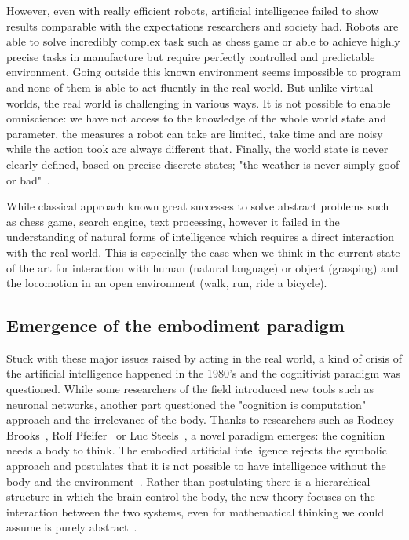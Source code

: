 However, even with really efficient robots, artificial intelligence failed to show results comparable with the expectations researchers and society had. Robots are able to solve incredibly complex task such as chess game or able to achieve highly precise tasks in manufacture but require perfectly controlled and predictable environment. Going outside this known environment seems impossible to program and none of them is able to act fluently in the real world.
But unlike virtual worlds, the real world is challenging in various ways. It is not possible to enable omniscience: we have not access to the knowledge of the whole world state and parameter, the measures a robot can take are limited, take time and are noisy while the action took are always different that. Finally, the world state is never clearly defined, based on precise discrete states; "the weather is never simply goof or bad"~\cite{piefer06}.

While classical approach known great successes to solve abstract problems such as chess game, search engine, text processing, however it failed in the understanding of natural forms of intelligence which requires a direct interaction with the real world. This is especially the case when we think in the current state of the art for interaction with human (natural language) or object (grasping) and the locomotion in an open environment (walk, run, ride a bicycle).

\subsection{Emergence of the embodiment paradigm} %

Stuck with these major issues raised by acting in the real world, a kind of crisis of the artificial intelligence happened in the 1980's and the cognitivist paradigm was questioned. While some researchers of the field introduced new tools such as neuronal networks, another part questioned the "cognition is computation" approach and the irrelevance of the body.
Thanks to researchers such as Rodney Brooks~\cite{brooks1986achieving}, Rolf Pfeifer~\cite{pfeifer2001understanding} or Luc Steels~\cite{steels1995artificial}, a novel paradigm emerges: the cognition needs a body to think. The embodied artificial intelligence rejects the symbolic approach and postulates that it is not possible to have intelligence without the body and the environment~\cite{pfeifer2001understanding}. Rather than postulating there is a hierarchical structure in which the brain control the body, the new theory focuses on the interaction between the two systems, even for mathematical thinking we could assume is purely abstract~\cite{lakoff2000mathematics}.

